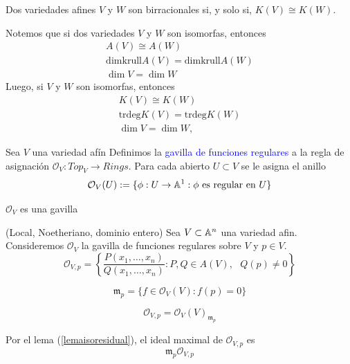     \begin{propo}
        Dos variedades afines $V$ y $W$ son birracionales si, y solo si, $K(V)\cong K(W)$.
    \end{propo}

    \begin{remark}
        Notemos que si dos variedades $V$ y $W$ son isomorfas, entonces
        \begin{gather*}
            A(V)\cong A(W)\\
            \mathrm{dimkrull} A(V)=\mathrm{dimkrull} A(W)\\
            \dim V = \dim W
        \end{gather*}
        Luego, si $V$ y $W$ son isomorfas, entonces
        \begin{gather*}
            K(V)\cong K(W)\\
            \mathrm{trdeg}K(V)=\mathrm{trdeg}K(W)\\
            \dim V=\dim W,\qquad 
        \end{gather*}
    \end{remark}
    
    \begin{definition}
        Sea $V$ una variedad afín Definimos la \textcolor{blue}{gavilla de funciones regulares} a la regla de asignación $\mathcal{O}_V:Top_V\to Rings$. Para cada abierto $U\subset V$ se le asigna el anillo
            \begin{equation*}
                \mathcal{O}_V(U):=\{\phi:U\to\mathbb{A}^1: \phi\text{ es regular en }U\}
            \end{equation*}
    \end{definition}

    \begin{propo}
        $\mathcal{O}_V$ es una gavilla
    \end{propo}
    
    \begin{example}(Local, Noetheriano, dominio entero)\label{anillolocalafin}
        Sea $V\subset\mathbb{A}^n$ una variedad afin. Consideremos $\mathcal{O}_{V}$ la gavilla de funciones regulares sobre $V$ y $p\in V$. 
        $$\mathcal{O}_{V,p}=\left\{\frac{P(x_1,\dots,x_n)}{Q(x_1,\dots,x_n)}:P,Q\in A(V),\text{ }Q(p)\neq 0 \right\} $$

        \begin{equation*}
            \mathfrak{m}_p=\{f\in\mathcal{O}_V(V):f(p)=0\}
        \end{equation*}

        \begin{equation*}
            \mathcal{O}_{V,p}=\mathcal{O}_V(V)_{\mathfrak{m}_p}
        \end{equation*}

        Por el lema (\ref{lemaisoresidual}), el ideal maximal de $\mathcal{O}_{V,p}$ es
        \begin{equation*}
            \mathfrak{m}_p\mathcal{O}_{V,p}
        \end{equation*}
    \end{example}

